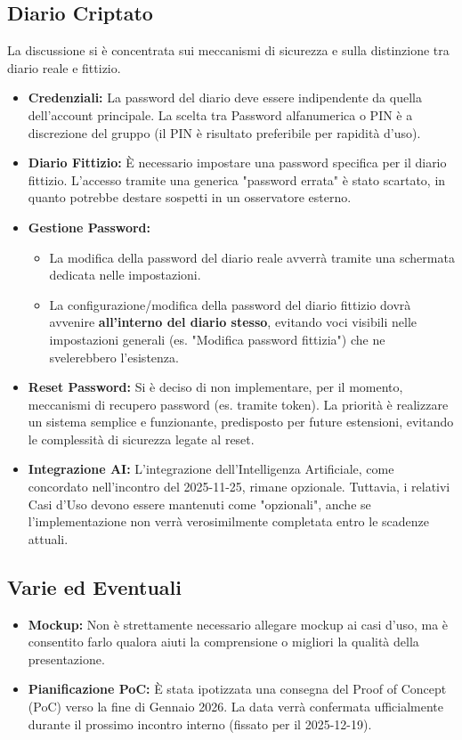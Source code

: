 \documentclass[a4paper,12pt]{article}
\begin{document}
\subsection{Diario Criptato}
La discussione si è concentrata sui meccanismi di sicurezza e sulla distinzione tra diario reale e fittizio.
\begin{itemize}
    \item \textbf{Credenziali:} La password del diario deve essere indipendente da quella dell'account principale. La scelta tra Password alfanumerica o PIN è a discrezione del gruppo (il PIN è risultato preferibile per rapidità d'uso).
    \item \textbf{Diario Fittizio:} È necessario impostare una password specifica per il diario fittizio. L'accesso tramite una generica "password errata" è stato scartato, in quanto potrebbe destare sospetti in un osservatore esterno.
    \item \textbf{Gestione Password:}
    \begin{itemize}
        \item La modifica della password del diario reale avverrà tramite una schermata dedicata nelle impostazioni.
        \item La configurazione/modifica della password del diario fittizio dovrà avvenire \textbf{all'interno del diario stesso}, evitando voci visibili nelle impostazioni generali (es. "Modifica password fittizia") che ne svelerebbero l'esistenza.
    \end{itemize}
    \item \textbf{Reset Password:} Si è deciso di non implementare, per il momento, meccanismi di recupero password (es. tramite token). La priorità è realizzare un sistema semplice e funzionante, predisposto per future estensioni, evitando le complessità di sicurezza legate al reset.
    \item \textbf{Integrazione AI:} L'integrazione dell'Intelligenza Artificiale, come concordato nell'incontro del 2025-11-25, rimane opzionale. Tuttavia, i relativi Casi d'Uso devono essere mantenuti come "opzionali", anche se l'implementazione non verrà verosimilmente completata entro le scadenze attuali.
\end{itemize}

\subsection{Varie ed Eventuali}
\begin{itemize}
    \item \textbf{Mockup:} Non è strettamente necessario allegare mockup ai casi d'uso, ma è consentito farlo qualora aiuti la comprensione o migliori la qualità della presentazione.
    \item \textbf{Pianificazione PoC:} È stata ipotizzata una consegna del Proof of Concept (PoC) verso la fine di Gennaio 2026. La data verrà confermata ufficialmente durante il prossimo incontro interno (fissato per il 2025-12-19).
\end{itemize}
\end{document}
